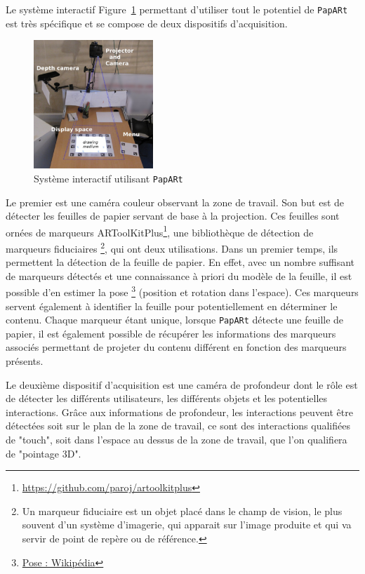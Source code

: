 Le système interactif Figure~\ref{fig:papartsystem} permettant d'utiliser tout le potentiel de \texttt{PapARt} est très spécifique et se compose de deux dispositifs d'acquisition.

\begin{figure}[H]
\centering
\includegraphics[width=0.4\textwidth]{images/papart-system}
\caption{Système interactif utilisant \texttt{PapARt}\protect\footnotemark}
\label{fig:papartsystem}
\end{figure}


Le premier est une caméra couleur observant la zone de travail. Son but est de détecter les feuilles de papier servant de base à la projection. Ces feuilles sont ornées de marqueurs ARToolKitPlus\footnote{\href{https://github.com/paroj/artoolkitplus}{https://github.com/paroj/artoolkitplus}}, une bibliothèque de détection de marqueurs fiduciaires \footnote{Un marqueur fiduciaire est un objet placé dans le champ de vision, le plus souvent d'un système d'imagerie, qui apparait sur l'image produite et qui va servir de point de repère ou de référence.}, qui ont deux utilisations. 
Dans un premier temps, ils permettent la détection de la feuille de papier. En effet, avec un nombre suffisant de marqueurs détectés et une connaissance à priori du modèle de la feuille, il est possible d'en estimer la pose \footnote{\href{https://en.wikipedia.org/wiki/Pose_(computer_vision)}{Pose : Wikipédia}} (position et rotation dans l'espace). 
Ces marqueurs servent également à identifier la feuille pour potentiellement en déterminer le contenu. Chaque marqueur étant unique, lorsque \texttt{PapARt} détecte une feuille de papier, il est également possible de récupérer les informations des marqueurs associés permettant de projeter du contenu différent en fonction des marqueurs présents.

Le deuxième dispositif d'acquisition est une caméra de profondeur dont le rôle est de détecter les différents utilisateurs, les différents objets et les potentielles interactions. Grâce aux informations de profondeur, les interactions peuvent être détectées soit sur le plan de la zone de travail, ce sont des interactions qualifiées de "touch", soit dans l'espace au dessus de la zone de travail, que l'on qualifiera de "pointage 3D".

